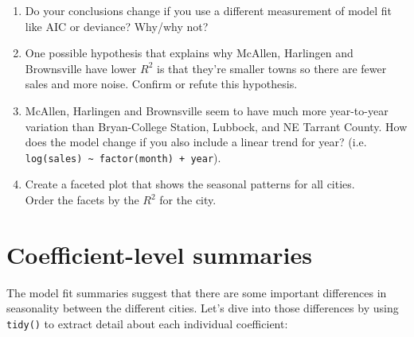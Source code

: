 \begin{enumerate}
\def\labelenumi{\arabic{enumi}.}
\item
  Do your conclusions change if you use a different measurement of model
  fit like AIC or deviance? Why/why not?
\item
  One possible hypothesis that explains why McAllen, Harlingen and
  Brownsville have lower \(R^2\) is that they're smaller towns so there
  are fewer sales and more noise. Confirm or refute this hypothesis.
\item
  McAllen, Harlingen and Brownsville seem to have much more year-to-year
  variation than Bryan-College Station, Lubbock, and NE Tarrant County.
  How does the model change if you also include a linear trend for year?
  (i.e. \texttt{log(sales)\ \textasciitilde{}\ factor(month)\ +\ year}).
\item
  Create a faceted plot that shows the seasonal patterns for all
  cities.\\
  Order the facets by the \(R^2\) for the city.
\end{enumerate}

\section{Coefficient-level summaries}

The model fit summaries suggest that there are some important
differences in seasonality between the different cities. Let's dive into
those differences by using \texttt{tidy()} to extract detail about each
individual coefficient: 

\begin{Shaded}
\end{Shaded}

